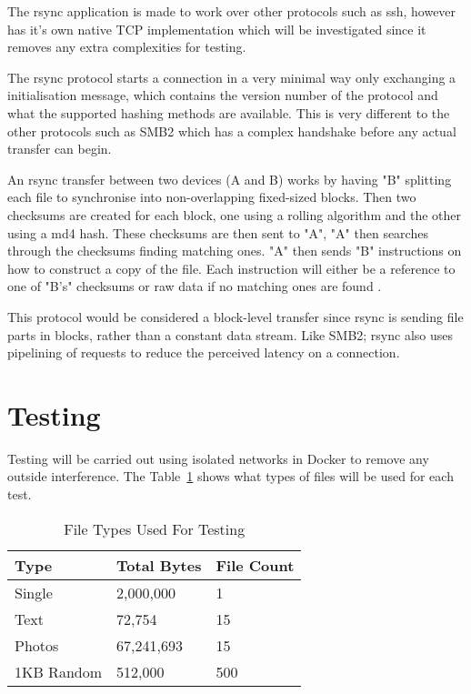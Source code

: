 The rsync application is made to work over other protocols such as ssh, however has it's own native TCP implementation which will be investigated since it removes any extra complexities for testing.

The rsync protocol starts a connection in a very minimal way only exchanging a initialisation message, which contains the version number of the protocol and what the supported hashing methods are available. This is very different to the other protocols such as SMB2 which has a complex handshake before any actual transfer can begin.

An rsync transfer between two devices (A and B) works by having "B" splitting each file to synchronise into non-overlapping fixed-sized blocks. Then two checksums are created for each block, one using a rolling algorithm and the other using a md4 hash. These checksums are then sent to "A", "A" then searches through the checksums finding matching ones. "A" then sends "B" instructions on how to construct a copy of the file. Each instruction will either be a reference to one of "B's" checksums or raw data if no matching ones are found \parencite{tridgell1996rsync}.


This protocol would be considered a block-level transfer since rsync is sending file parts in blocks, rather than a constant data stream. Like SMB2; rsync also uses pipelining of requests to reduce the perceived latency on a connection.


\section{Testing}

Testing will be carried out using isolated networks in Docker to remove any outside interference. The Table~\ref{tab:file-types-used-for-testing} shows what types of files will be used for each test.

\begin{table}[h!]
	\caption{File Types Used For Testing}
	\label{tab:file-types-used-for-testing}
	\centering
	\begin{tabular}{ l l l }
		\hline
		\textbf{Type} & \textbf{Total Bytes} & \textbf{File Count} \\
		\hline
		Single        & 2,000,000            & 1                   \\
		\hline
		Text          & 72,754               & 15                  \\
		\hline
		Photos        & 67,241,693           & 15                  \\
		\hline
		1KB Random    & 512,000              & 500                 \\
		\hline
	\end{tabular}
\end{table}

